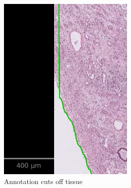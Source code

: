 \begin{figure}[h!t]
\begin{subfigure}[b]{0.36\textwidth}
\begin{subfigure}[t]{\textwidth}
        \includegraphics[width=\textwidth]{latex/QuPathScreenshots/annotationTooSoonSmall.png}
        \caption{Annotation cuts off tissue}
        \label{fig:CutOff}
        \vspace*{5mm}
      \end{subfigure}
    \\
      \begin{subfigure}[b]{\textwidth}

\end{subfigure}
\end{subfigure}
\end{figure}
